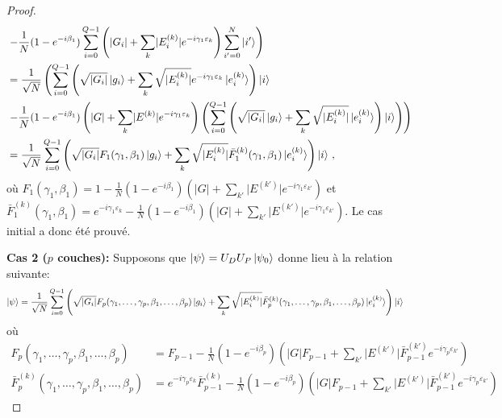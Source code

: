 \begin{proof}
\begin{equation}
\begin{aligned}
    & \left. - \frac{1}{N} (1 - e^{-i\beta_{1}}) \sum_{i=0}^{Q-1} \left( \lvert G_{i} \rvert + \sum_{k} \lvert E^{(k)}_{i} \rvert e^{-i \gamma_{1} \varepsilon_{k}} \right) \sum_{i'=0}^{N} \ket{i'} \right) \\
    &=  \frac{1}{ \sqrt{ N }} \left(  \sum_{i=0}^{Q-1}  \left( \sqrt{ \lvert G_{i} \rvert  } \ket{g_{i}} + \sum_{k} \sqrt{ \lvert E^{(k)}_{i} \rvert } e^{-i \gamma_{1} \varepsilon_{k}} \ket{e^{(k)}_{i}} \right) \ket{i} \right. \\
    & \left. - \frac{1}{N} (1 - e^{-i\beta_{1}}) \left( \lvert G \rvert + \sum_{k} \lvert E^{(k)} \rvert e^{-i \gamma_{1} \varepsilon_{k}}   \right) \left( \sum_{i=0}^{Q-1} \left( \sqrt{ \lvert G_{i} \rvert  } \ket{g_{i}} + \sum_{k} \sqrt{ \lvert E^{(k)}_{i} \rvert } \ket{e^{(k)}_{i}} \right) \ket{i} \right) \right) \\
    &= \frac{1}{\sqrt{ N }} \sum_{i=0}^{Q-1} \left( \sqrt{ \lvert G_{i} \rvert } F_{1}(\gamma_{1}, \beta_{1}) \ket{g_{i}} + \sum_{k} \sqrt{ \lvert E^{(k)}_{i} \rvert } \bar{F}^{(k)}_{1}(\gamma_{1}, \beta_{1}) \ket{e^{(k)}_{i}} \right) \ket{i} \,,
\end{aligned}
\end{equation}
où $F_{1}(\gamma_{1}, \beta_{1}) = 1 - \frac{1}{N} (1 - e^{-i\beta_{1}}) \left(  \lvert G \rvert + \sum_{k'} \lvert E^{(k')} \rvert e^{-i \gamma_{1} \varepsilon_{k'}} \right)$ et $\bar{F}^{(k)}_{1}(\gamma_{1}, \beta_{1}) = e^{-i\gamma_{1} \varepsilon_{k}} - \frac{1}{N} (1 - e^{-i\beta_{1}}) \left(  \lvert G \rvert + \sum_{k'} \lvert E^{(k')} \rvert e^{-i \gamma_{1} \varepsilon_{k'}} \right)$. Le cas initial a donc été prouvé.

\textbf{Cas 2 ($p$ couches):}
Supposons que $\ket{\psi} = U_{D}U_{P}\ket{\psi_{0}}$ donne lieu à la relation suivante:
\begin{equation}
\begin{aligned}
    \ket{\psi} &= \frac{1}{\sqrt{ N }} \sum_{i=0}^{Q-1} \left( \sqrt{ \lvert G_{i} \rvert } F_{p}(\gamma_{1}, \dots, \gamma_{p}, \beta_{1}, \dots, \beta_{p}) \ket{g_{i}} + \sum_{k} \sqrt{ \lvert E^{(k)}_{i} \rvert } \bar{F}^{(k)}_{p}(\gamma_{1}, \dots, \gamma_{p}, \beta_{1}, \dots, \beta_{p}) \ket{e^{(k)}_{i}} \right) \ket{i}
\end{aligned}
\end{equation}
où
\begin{equation}
\begin{aligned}
    F_{p}(\gamma_{1}, \dots, \gamma_{p}, \beta_{1}, \dots, \beta_{p}) &= F_{p-1} - \frac{1}{N} (1-e^{-i\beta_{p}}) \left( \lvert G \rvert   F_{p-1} + \sum_{k'} \lvert E^{(k')} \rvert \bar{F}^{(k')}_{p-1} e^{-i\gamma_{p}\varepsilon_{k'}} \right) \\
    \bar{F}^{(k)}_{p}(\gamma_{1}, \dots, \gamma_{p}, \beta_{1}, \dots, \beta_{p}) &= e^{-i\gamma_{p} \varepsilon_{k}}\bar{F}_{p-1}^{(k)} - \frac{1}{N} (1-e^{-i\beta_{p}}) \left( \lvert G \rvert   F_{p-1} + \sum_{k'} \lvert E^{(k')} \rvert \bar{F}^{(k')}_{p-1} e^{-i\gamma_{p}\varepsilon_{k'}} \right)
\end{aligned}
\end{equation}


\end{proof}
